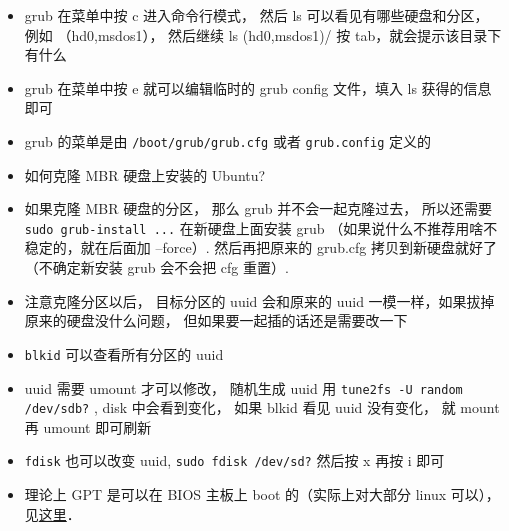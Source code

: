 \begin{itemize}
\item grub 在菜单中按 c 进入命令行模式， 然后 ls 可以看见有哪些硬盘和分区， 例如 （hd0,msdos1）， 然后继续 ls (hd0,msdos1)/ 按 tab，就会提示该目录下有什么
\item grub 在菜单中按 e 就可以编辑临时的 grub config 文件，填入 ls 获得的信息即可
\item grub 的菜单是由 \verb|/boot/grub/grub.cfg| 或者 \verb|grub.config| 定义的
\item 如何克隆 MBR 硬盘上安装的 Ubuntu?
\item 如果克隆 MBR 硬盘的分区， 那么 grub 并不会一起克隆过去， 所以还需要 \verb|sudo grub-install ...| 在新硬盘上面安装 grub （如果说什么不推荐用啥不稳定的，就在后面加 --force）. 然后再把原来的 grub.cfg 拷贝到新硬盘就好了（不确定新安装 grub 会不会把 cfg 重置）.
\item 注意克隆分区以后， 目标分区的 uuid 会和原来的 uuid 一模一样，如果拔掉原来的硬盘没什么问题， 但如果要一起插的话还是需要改一下
\item \verb|blkid| 可以查看所有分区的 uuid
\item uuid 需要 umount 才可以修改， 随机生成 uuid 用 \verb|tune2fs -U random /dev/sdb?| , disk 中会看到变化， 如果 blkid 看见 uuid 没有变化， 就 mount 再 umount 即可刷新
\item \verb|fdisk| 也可以改变 uuid, \verb|sudo fdisk /dev/sd?| 然后按 x 再按 i 即可
\item 理论上 GPT 是可以在 BIOS 主板上 boot 的（实际上对大部分 linux 可以）， 见\href{https://superuser.com/questions/1337344/is-it-possible-to-boot-linux-from-a-gpt-disk-on-a-bios-system}{这里}．
\end{itemize}
